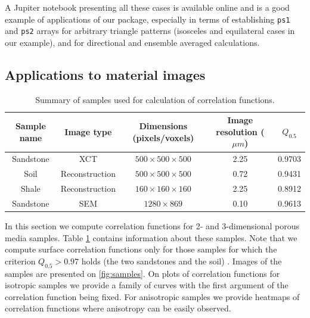 \documentclass[reprint,amsmath,amssymb,aps,pre,showkeys,showpacs]{revtex4-1}
\newcommand{\code}[1]{\colorbox{light-gray}{\texttt{#1}}}
\begin{document}
A Jupiter notebook presenting all these cases is available online
\cite{Repo_example} and is a good example of applications of our package,
especially in terms of establishing \code{ps1} and \code{ps2} arrays for
arbitrary triangle patterns (isosceles and equilateral cases in our example),
and for directional and ensemble averaged calculations.

\subsection{Applications to material images}
\begin{table}[!htp]
  \centering
  \begin{tabular}{|c|c|c|c|c|}
    \hline
    Sample name & Image type & Dimensions (pixels/voxels) & Image resolution ($\mu m$)
    & $Q_{0.5}$ \\
    \hline
    Sandstone & XCT &  $500 \times 500 \times 500$ & 2.25 & 0.9703 \\
    Soil & Reconstruction & $500 \times 500 \times 500$ & 0.72 & 0.9431 \\
    Shale & Reconstruction & $160 \times 160 \times 160$ & 2.25 & 0.8912 \\
    Sandstone & SEM &  $1280 \times 869$ & 0.10 & 0.9613 \\
    \hline
  \end{tabular}
  \caption{Summary of samples used for calculation of correlation functions.}
  \label{tab:summary}
\end{table}
In this section we compute correlation functions for 2- and 3-dimensional porous
media samples. Table \ref{tab:summary} contains information about these
samples. Note that we compute surface correlation functions only for those
samples for which the criterion $Q_{0.5} > 0.97$ holds (the two sandstones and
the soil) \cite{samarin2023robust}. Images of the samples are presented on
\cref{fig:samples}. On plots of correlation functions for isotropic samples we
provide a family of curves with the first argument of the correlation function
being fixed. For anisotropic samples we provide heatmaps of correlation
functions where anisotropy can be easily observed.
\end{document}

